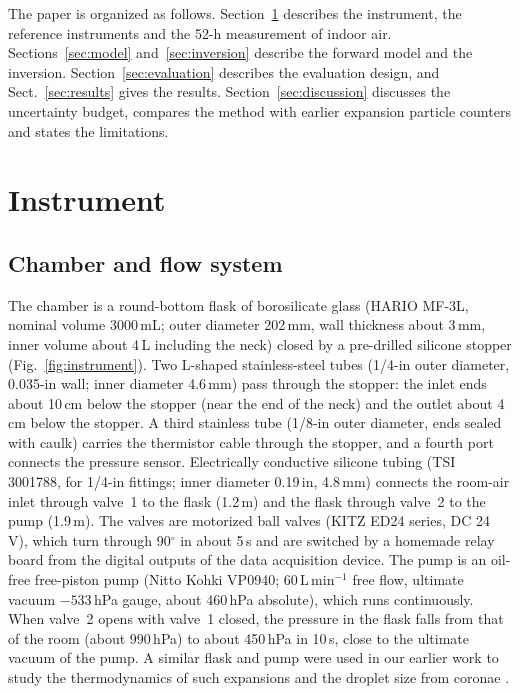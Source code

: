 \documentclass[preprint,review,12pt,authoryear]{elsarticle}
\begin{document}
The paper is organized as follows. Section~\ref{sec:instrument} describes the instrument, the
reference instruments and the 52-h measurement of indoor air.
Sections~\ref{sec:model} and~\ref{sec:inversion} describe the forward model and the inversion.
Section~\ref{sec:evaluation} describes the evaluation design, and Sect.~\ref{sec:results} gives the results.
Section~\ref{sec:discussion} discusses the uncertainty budget, compares the method with earlier expansion
particle counters and states the limitations.


\section{Instrument}
\label{sec:instrument}
\subsection{Chamber and flow system}
\label{sec:chamber}
The chamber is a round-bottom flask of borosilicate glass (HARIO MF-3L, nominal volume 3000\,mL; outer
diameter 202\,mm, wall thickness about 3\,mm, inner volume about 4\,L including the neck) closed by
a pre-drilled silicone stopper
(Fig.~\ref{fig:instrument}).
Two L-shaped stain\-less-steel tubes (1/4-in outer diameter, 0.035-in wall; inner diameter 4.6\,mm)
pass through
the stopper: the inlet ends about 10\,cm below the stopper (near the end of the neck) and the
outlet about 4\,cm below the stopper.
A third stainless tube (1/8-in outer diameter, ends sealed with caulk) carries the thermistor cable through
the stopper, and a fourth port connects the pressure sensor.
Electrically conductive silicone tubing
(TSI 3001788, for 1/4-in fittings; inner diameter 0.19\,in, 4.8\,mm) connects the room-air inlet
through valve~1 to the flask (1.2\,m) and the flask
through valve~2 to the pump (1.9\,m). The valves are motorized ball
valves (KITZ ED24 series, DC 24\,V), which turn through 90$^\circ$ in about 5\,s and are switched by
a homemade relay board from the digital outputs of the data acquisition device.
The pump is an oil-free free-piston
pump (Nitto Kohki VP0940; 60\,L\,min$^{-1}$ free flow, ultimate vacuum $-533$\,hPa gauge, about
460\,hPa absolute), which runs
continuously. When valve~2 opens with valve~1 closed, the pressure in the flask falls from that of
the room (about 990\,hPa) to about 450\,hPa in 10\,s, close to the ultimate vacuum of the pump.
A similar flask and pump were used in our earlier work to study the thermodynamics of such expansions
\citep{moteki2013new} and the droplet size from coronae \citep{aoki2013corona}.
\end{document}
